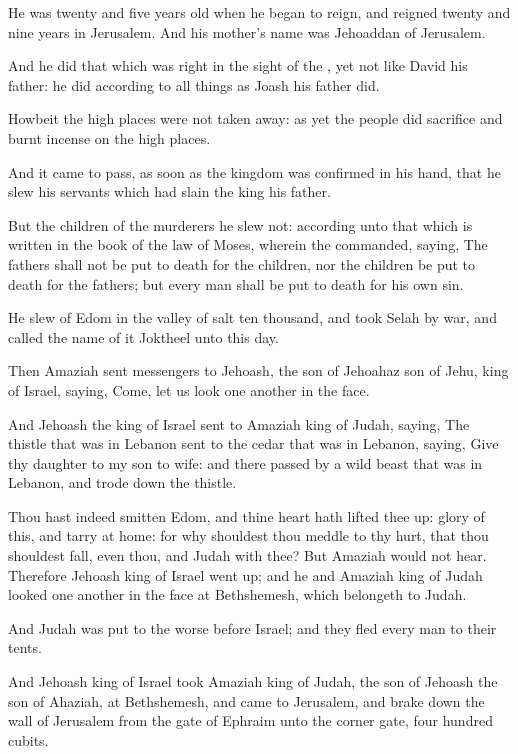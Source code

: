 \verse He was twenty and five years old when he began to reign, and reigned twenty and nine years in Jerusalem. And his mother's name was Jehoaddan of Jerusalem.

\verse And he did that which was right in the sight of the \LORD, yet not like David his father: he did according to all things as Joash his father did.

\verse Howbeit the high places were not taken away: as yet the people did sacrifice and burnt incense on the high places.

\verse And it came to pass, as soon as the kingdom was confirmed in his hand, that he slew his servants which had slain the king his father.

\verse But the children of the murderers he slew not: according unto that which is written in the book of the law of Moses, wherein the \LORD commanded, saying, The fathers shall not be put to death for the children, nor the children be put to death for the fathers; but every man shall be put to death for his own sin.

\verse He slew of Edom in the valley of salt ten thousand, and took Selah by war, and called the name of it Joktheel unto this day.

\verse Then Amaziah sent messengers to Jehoash, the son of Jehoahaz son of Jehu, king of Israel, saying, Come, let us look one another in the face.

\verse And Jehoash the king of Israel sent to Amaziah king of Judah, saying, The thistle that was in Lebanon sent to the cedar that was in Lebanon, saying, Give thy daughter to my son to wife: and there passed by a wild beast that was in Lebanon, and trode down the thistle.

\verse Thou hast indeed smitten Edom, and thine heart hath lifted thee up: glory of this, and tarry at home: for why shouldest thou meddle to thy hurt, that thou shouldest fall, even thou, and Judah with thee?  \verse But Amaziah would not hear. Therefore Jehoash king of Israel went up; and he and Amaziah king of Judah looked one another in the face at Bethshemesh, which belongeth to Judah.

\verse And Judah was put to the worse before Israel; and they fled every man to their tents.

\verse And Jehoash king of Israel took Amaziah king of Judah, the son of Jehoash the son of Ahaziah, at Bethshemesh, and came to Jerusalem, and brake down the wall of Jerusalem from the gate of Ephraim unto the corner gate, four hundred cubits.

